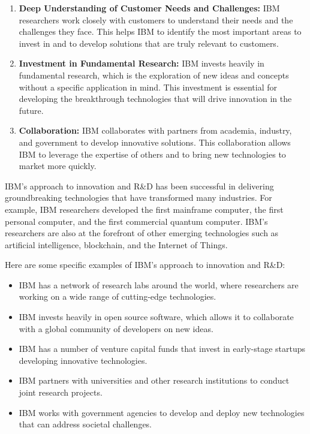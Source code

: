 \begin{enumerate}
  \item \textbf{Deep Understanding of Customer Needs and Challenges:} IBM researchers work closely with customers to understand their needs and the challenges they face. This helps IBM to identify the most important areas to invest in and to develop solutions that are truly relevant to customers.
  
  \item \textbf{Investment in Fundamental Research:} IBM invests heavily in fundamental research, which is the exploration of new ideas and concepts without a specific application in mind. This investment is essential for developing the breakthrough technologies that will drive innovation in the future.
  
  \item \textbf{Collaboration:} IBM collaborates with partners from academia, industry, and government to develop innovative solutions. This collaboration allows IBM to leverage the expertise of others and to bring new technologies to market more quickly.
\end{enumerate}

IBM's approach to innovation and R\&D has been successful in delivering groundbreaking technologies that have transformed many industries. For example, IBM researchers developed the first mainframe computer, the first personal computer, and the first commercial quantum computer. IBM's researchers are also at the forefront of other emerging technologies such as artificial intelligence, blockchain, and the Internet of Things.

Here are some specific examples of IBM's approach to innovation and R\&D:

\begin{itemize}
  \item IBM has a network of research labs around the world, where researchers are working on a wide range of cutting-edge technologies.
  \item IBM invests heavily in open source software, which allows it to collaborate with a global community of developers on new ideas.
  \item IBM has a number of venture capital funds that invest in early-stage startups developing innovative technologies.
  \item IBM partners with universities and other research institutions to conduct joint research projects.
  \item IBM works with government agencies to develop and deploy new technologies that can address societal challenges.
\end{itemize}

